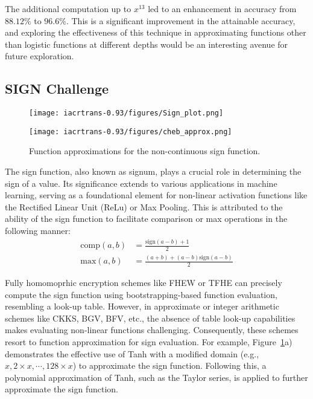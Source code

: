 \documentclass[journal=tosc,final]{iacrtrans}
\begin{document}
The additional computation up to $x^{13}$ led to an enhancement in accuracy from $88.12\%$ to $96.6\%$. This is a significant improvement in the attainable accuracy, and exploring the effectiveness of this technique in approximating functions other than logistic functions at different depths would be an interesting avenue for future exploration.

  
\subsection{SIGN Challenge}
\begin{figure}
    \begin{minipage}{.48\textwidth}
    \centering
    \texttt{[image: iacrtrans-0.93/figures/Sign\_plot.png]}
    \end{minipage}
    \hfill
    \begin{minipage}{.48\textwidth}
    \centering
    \texttt{[image: iacrtrans-0.93/figures/cheb\_approx.png]}
    \end{minipage}
    \caption{Function approximations for the non-continuous sign function.}
    \label{fig:sign_approx_cheb}
\end{figure}

The sign function, also known as signum, plays a crucial role in determining the sign of a value. Its significance extends to various applications in machine learning, serving as a foundational element for non-linear activation functions like the Rectified Linear Unit (ReLu) or Max Pooling. This is attributed to the ability of the sign function to facilitate comparison or max operations in the following manner:
\begin{align}
    \text{comp}(a,b) &= \frac{ \text{sign}(a-b)+1}{2}\\
    \text{max}(a,b) &= \frac{ (a+b)+(a-b) \text{sign}(a-b)}{2}
\end{align}

Fully homomoprhic encryption schemes like FHEW or TFHE can precisely compute the sign function using bootstrapping-based function evaluation, resembling a look-up table. However, in approximate or integer arithmetic schemes like CKKS, BGV, BFV, etc., the absence of table look-up capabilities makes evaluating non-linear functions challenging. Consequently, these schemes resort to function approximation for sign evaluation. For example, Figure~\ref{fig:sign_approx_cheb}a) demonstrates the effective use of Tanh with a modified domain (e.g., $x, 2\times x, \cdots, 128\times x$) to approximate the sign function. Following this, a polynomial approximation of Tanh, such as the Taylor series, is applied to further approximate the sign function.
\end{document}
